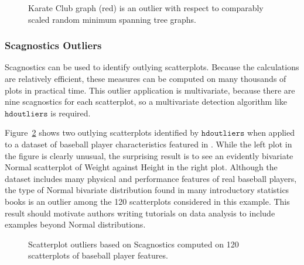 \documentclass[12pt]{article}
\begin{document}
\begin{figure}[h]
\caption{\label{fig:graphs} Karate Club graph (red) is an outlier with respect to comparably scaled random minimum spanning tree graphs.}
\end{figure}


\subsubsection{Scagnostics Outliers}
Scagnostics \citep{Scagnostics} can be used to identify outlying scatterplots. Because the calculations are relatively efficient, these measures can be computed on many thousands of plots in practical time. This outlier application is multivariate, because there are nine scagnostics for each scatterplot, so a multivariate detection algorithm like $\mathtt{hdoutliers}$ is required. 

Figure~\ref{fig:Scagnostics} shows two outlying scatterplots identified by  $\mathtt{hdoutliers}$ when applied to a dataset of baseball player characteristics featured in \cite{ScagnosticsTVCG}. While the left plot in the figure is clearly unusual, the surprising result is to see an evidently bivariate Normal scatterplot of Weight against Height in the right plot. Although the dataset includes many physical and performance features of real baseball players, the type of Normal bivariate distribution found in many introductory statistics books is an outlier among the 120 scatterplots considered in this example. This result should motivate authors writing tutorials on data analysis to include examples beyond Normal distributions.

\begin{figure}[h]
\caption{\label{fig:Scagnostics} Scatterplot outliers based on Scagnostics computed on 120 scatterplots of baseball player features.}
\end{figure}
\end{document}
